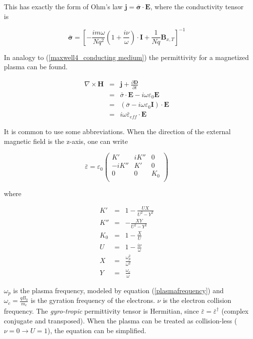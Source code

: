\documentclass[a4paper,14pt]{extbook}
\begin{document}
This has exactly the form of Ohm's law $\mathbf{j}= \mathbf{\bar{\sigma}} \cdot \mathbf{E}$, where the conductivity tensor is

\begin{equation}\label{conductivity_magnetoplasma}
    \mathbf{\bar{\sigma}} = \left[- \frac{i m \omega }{Nq^2} \left( 1   +  \frac{i \nu}{ \omega}\right) \cdot \mathbf{I}+\frac{1}{Nq} \mathbf{B}_{x,T} \right]^{-1}
\end{equation}

In analogy to (\ref{maxwell4_conducting medium}) the permittivity for a magnetized plasma can be found.

\begin{eqnarray}
\nabla \times \mathbf{H}&=&\mathbf{j}+ \frac{\partial \mathbf{D}}{\partial t} \label{maxwell4_magnetized_plasma}\\
&=&\bar{\sigma} \cdot \mathbf{E}- i \omega \varepsilon_0 \mathbf{E} \nonumber \\
&=&( \bar{\sigma} -  i \omega \varepsilon_0 \mathbf{I} )\cdot \mathbf{E} \nonumber \\
&=&i \omega \bar{\varepsilon}_{eff}\cdot \mathbf{E} \nonumber
\end{eqnarray}

It is common to use some abbreviations. When the direction of the external magnetic field is the z-axis, one can write

\begin{equation}\label{gyrotropic_tensor}
    \bar{\varepsilon}=\varepsilon_0\left(%
\begin{array}{ccc}
  K' & iK'' & 0 \\
-iK'' & K' & 0 \\
0 & 0 & K_0 \\\end{array}%
\right)
\end{equation}

where

\begin{eqnarray}
  K' &=& 1-\frac{UX}{U^2-Y^2} \\
K'' &=&- \frac{XY}{U^2-Y^2} \\
K_0 &=& 1-\frac{X}{U} \\
U &=&  1-\frac{i\nu}{\omega}\\
X &=&  \frac{\omega_p^2}{\omega^2}\\
Y &=& \frac{\omega_c}{\omega}
\end{eqnarray}

$\omega_p$ is the plasma frequency, modeled by equation (\ref{plasmafrequency}) and $\omega_c=\frac{qB_0}{m_e}$ is the gyration frequency of the electrons. $\nu$ is the electron collision frequency. The \emph{gyro-tropic} permittivity tensor is Hermitian, since $\bar{\varepsilon}=\bar{\varepsilon}^\dag$ (complex conjugate and transposed). When the plasma can be treated as collision-less ($\nu=0\rightarrow U=1$), the equation can be simplified.
\end{document}
